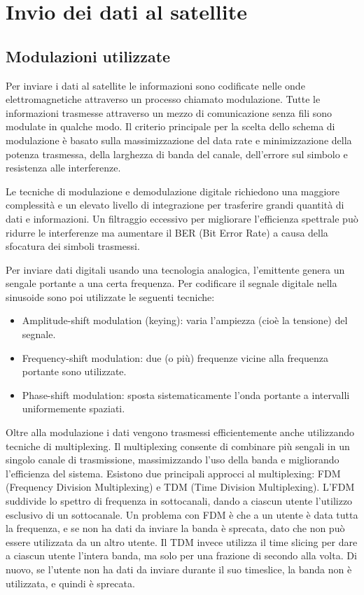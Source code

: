 
\chapter{Invio dei dati al satellite}
\section{Modulazioni utilizzate}
Per inviare i dati al satellite le informazioni sono codificate nelle onde elettromagnetiche attraverso un processo chiamato modulazione.
Tutte le informazioni trasmesse attraverso un mezzo di comunicazione senza fili sono modulate in qualche modo.
Il criterio principale per la scelta dello schema di modulazione è basato sulla massimizzazione del data rate e minimizzazione della potenza trasmessa, della larghezza di banda del canale, dell'errore sul simbolo e resistenza alle interferenze.

Le tecniche di modulazione e demodulazione digitale richiedono una maggiore complessità e un elevato livello di integrazione per trasferire grandi quantità di dati e informazioni.
Un filtraggio eccessivo per migliorare l'efficienza spettrale può ridurre le interferenze ma aumentare il \ac{BER} (Bit Error Rate) a causa della sfocatura dei simboli trasmessi.

Per inviare dati digitali usando una tecnologia analogica, l'emittente genera un sengale portante a una certa frequenza.
Per codificare il segnale digitale nella sinusoide sono poi utilizzate le seguenti tecniche:
\begin{itemize}
  \item Amplitude-shift modulation (keying): varia l'ampiezza (cioè la tensione) del segnale.
  \item Frequency-shift modulation: due (o più) frequenze vicine alla frequenza portante sono utilizzate.
  \item Phase-shift modulation: sposta sistematicamente l'onda portante a intervalli uniformemente spaziati.
\end{itemize}

Oltre alla modulazione i dati vengono trasmessi efficientemente anche utilizzando tecniche di multiplexing.
Il multiplexing consente di combinare più sengali in un singolo canale di trasmissione, massimizzando l'uso della banda e migliorando l'efficienza del sistema.
Esistono due principali approcci al multiplexing: FDM (Frequency Division Multiplexing) e TDM (Time Division Multiplexing).
L'FDM suddivide lo spettro di frequenza in sottocanali, dando a ciascun utente l'utilizzo esclusivo di un sottocanale.
Un problema con FDM è che a un utente è data tutta la frequenza, e se non ha dati da inviare la banda è sprecata, dato che non può essere utilizzata da un altro utente.
Il TDM invece utilizza il time slicing per dare a ciascun utente l'intera banda, ma solo per una frazione di secondo alla volta.
Di nuovo, se l'utente non ha dati da inviare durante il suo timeslice, la banda non è utilizzata, e quindi è sprecata.

